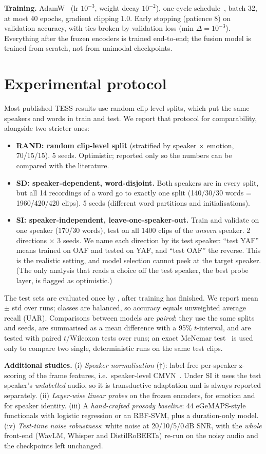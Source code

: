 \textbf{Training.} AdamW~\cite{adamw} (lr $10^{-3}$, weight decay $10^{-2}$), one-cycle schedule~\cite{onecycle}, batch 32, at most 40 epochs, gradient clipping 1.0.
Early stopping (patience 8) on validation accuracy, with ties broken by validation loss (min $\Delta=10^{-3}$).
Everything after the frozen encoders is trained end-to-end; the fusion model is trained from scratch, not from unimodal checkpoints.

\section{Experimental protocol}
Most published TESS results use random clip-level splits, which put the same speakers and words in train and test.
We report that protocol for comparability, alongside two stricter ones:
\begin{itemize}\setlength\itemsep{1pt}
\item \textbf{RAND: random clip-level split} (stratified by speaker $\times$ emotion, 70/15/15). 5 seeds. Optimistic; reported only so the numbers can be compared with the literature.
\item \textbf{SD: speaker-dependent, word-disjoint.} Both speakers are in every split, but all 14 recordings of a word go to exactly one split (140/30/30 words = 1960/420/420 clips). 5 seeds (different word partitions and initialisations).
\item \textbf{SI: speaker-independent, leave-one-speaker-out.} Train and validate on one speaker (170/30 words), test on all 1400 clips of the \emph{unseen} speaker. 2 directions $\times$ 3 seeds. We name each direction by its test speaker: ``test YAF'' means trained on OAF and tested on YAF, and ``test OAF'' the reverse.
This is the realistic setting, and model selection cannot peek at the target speaker. (The only analysis that reads a choice off the test speaker, the best probe layer, is flagged as optimistic.)
\end{itemize}
The test sets are evaluated once by , after training has finished. We report mean $\pm$ std over runs; classes are balanced, so accuracy equals unweighted average recall (UAR).
Comparisons between models are \emph{paired}: they use the same splits and seeds, are summarised as a mean difference with a 95\% $t$-interval, and are tested with paired $t$/Wilcoxon tests over runs; an exact McNemar test~\cite{dietterich} is used only to compare two single, deterministic runs on the same test clips.

\textbf{Additional studies.}
(i) \emph{Speaker normalisation} ($\dagger$): label-free per-speaker z-scoring of the frame features, i.e.\ speaker-level CMVN~\cite{cmvn}.
Under SI it uses the test speaker's \emph{unlabelled} audio, so it is transductive adaptation and is always reported separately.
(ii) \emph{Layer-wise linear probes} on the frozen encoders, for emotion and for speaker identity.
(iii) A \emph{hand-crafted prosody baseline}: 44 eGeMAPS-style~\cite{egemaps} functionals with logistic regression or an RBF-SVM, plus a duration-only model.
(iv) \emph{Test-time noise robustness}: white noise at 20/10/5/0\,dB SNR, with the \emph{whole} front-end (WavLM, Whisper and DistilRoBERTa) re-run on the noisy audio and the checkpoints left unchanged.
